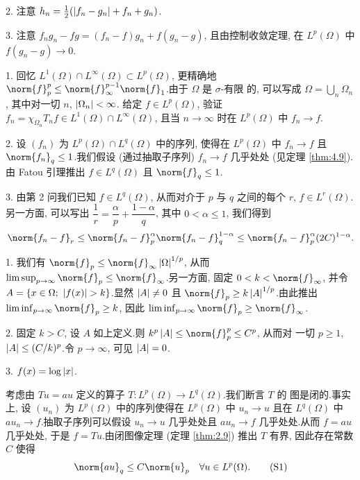 2. 注意 $h_n=\frac12(\left|f_n-g_n\right|+f_n+g_n)$.

3. 注意 $f_ng_n-fg=(f_n-f)g_n+f(g_n-g)$, 且由控制收敛定理, 在 $L^p(\Omega)$
中 $f(g_n-g)\to0$.


1. 回忆 $L^1(\Omega)\cap L^\infty(\Omega)\subset L^p(\Omega)$, 更精确地
$\norm{f}_p^p\le\norm{f}_\infty^{p-1}\norm{f}_1$.由于 $\Omega$ 是 $\sigma$-有限
的, 可以写成 $\Omega=\bigcup_n\Omega_n$, 其中对一切 $n$, $\left|\Omega_n\right|<\infty$.
给定 $f\in L^p(\Omega)$, 验证 $f_n=\chi_{\Omega_n}T_nf\in L^1(\Omega)\cap L^\infty(\Omega)$,
且当 $n\to\infty$ 时在 $L^p(\Omega)$ 中 $f_n\to f$.

2. 设 $(f_n)$ 为 $L^p(\Omega)\cap L^q(\Omega)$ 中的序列, 使得在 $L^p(\Omega)$
中 $f_n\to f$ 且 $\norm{f_n}_q\le1$.我们假设 (通过抽取子序列) $f_n\to f$
几乎处处 (见定理  \ref{thm:4.9}).由 Fatou 引理推出 $f\in L^q(\Omega)$ 且
$\norm{f}_q\le1$.

3. 由第 2 问我们已知 $f\in L^q(\Omega)$, 从而对介于 $p$ 与 $q$ 之间的每个
$r$, $f\in L^r(\Omega)$.另一方面, 可以写出 $\dfrac1r=\dfrac\alpha p+\dfrac{1-\alpha}{q}$,
其中 $0<\alpha\le1$, 我们得到
\begin{equation*}
\norm{f_n-f}_r\le\norm{f_n-f}_p^\alpha\norm{f_n-f}_q^{1-\alpha}
\le\norm{f_n-f}_p^\alpha(2C)^{1-\alpha}.
\end{equation*}


1. 我们有 $\norm{f}_p\le\norm{f}_\infty\abs{\Omega}^{1/p}$, 从而
$\limsup_{p\to\infty}\norm{f}_p\le\norm{f}_\infty$.另一方面, 固定
$0<k<\norm{f}_\infty$, 并令 $A=\{x\in\Omega;\ \abs{f(x)}>k\}$.显然
$\left|A\right|\ne0$ 且 $\norm{f}_p\ge k\abs{A}^{1/p}$.由此推出
$\liminf_{p\to\infty}\norm{f}_p\ge k$, 因此
$\liminf_{p\to\infty}\norm{f}_p\ge\norm{f}_\infty$.

2. 固定 $k>C$, 设 $A$ 如上定义.则 $k^p\abs{A}\le\norm{f}_p^p\le C^p$, 从而对
一切 $p\ge1$, $\left|A\right|\le(C/k)^p$.令 $p\to\infty$, 可见 $\left|A\right|=0$.

3. $f(x)=\log\left|x\right|$.


考虑由 $Tu=au$ 定义的算子 $T:L^p(\Omega)\to L^q(\Omega)$.我们断言 $T$ 的
图是闭的.事实上, 设 $(u_n)$ 为 $L^p(\Omega)$ 中的序列使得在 $L^p(\Omega)$
中 $u_n\to u$ 且在 $L^q(\Omega)$ 中 $au_n\to f$.抽取子序列可以假设
$u_n\to u$ 几乎处处且 $au_n\to f$ 几乎处处.从而 $f=au$ 几乎处处, 于是
$f=Tu$.由闭图像定理 (定理  \ref{thm:2.9}) 推出 $T$ 有界, 因此存在常数 $C$
使得
\begin{equation}
\norm{au}_q\le C\norm{u}_p\quad\forall u\in L^p(\Omega).
\tag{S1}
\label{eq:S4.7}
\end{equation}

